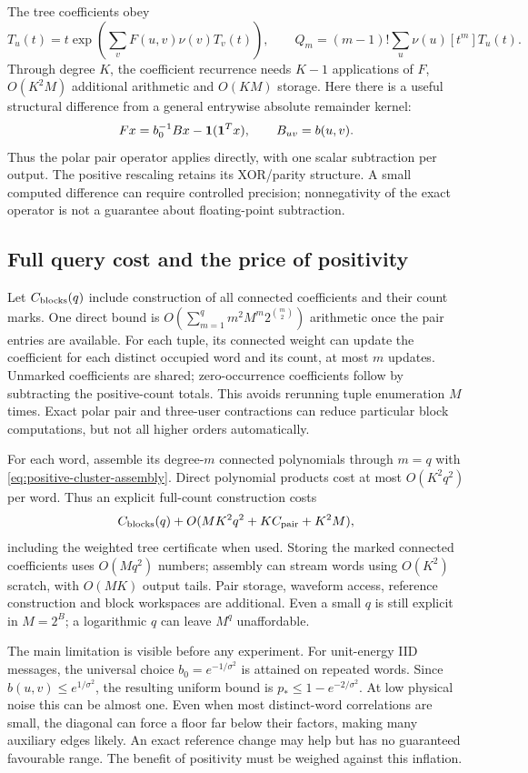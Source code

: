 \documentclass[10pt,a4paper]{article}
\begin{document}
The tree coefficients obey
\[
 T_u(t)=t\exp\!\left(\sum_v F(u,v)\nu(v)T_v(t)\right),\qquad
 Q_m=(m-1)!\sum_u\nu(u)[t^m]T_u(t).
\]
Through degree $K$, the coefficient recurrence needs $K-1$ applications of $F$, $O(K^2M)$ additional
arithmetic and $O(KM)$ storage. Here there is a useful structural difference from a general entrywise
absolute remainder kernel:
\begin{equation}
 F x=b_0^{-1}B x-\mathbf{1}(\mathbf{1}^Tx),\qquad B_{uv}=b(u,v).
 \label{eq:positive-cluster-operator}
\end{equation}
Thus the polar pair operator applies directly, with one scalar subtraction per output. The positive
rescaling retains its XOR/parity structure. A small computed difference can require controlled precision;
nonnegativity of the exact operator is not a guarantee about floating-point subtraction.

\subsection{Full query cost and the price of positivity}
Let $C_{\rm blocks}(q)$ include construction of all connected coefficients and their count marks.
One direct bound is
$O(\sum_{m=1}^q m^2 M^m2^{\binom m2})$ arithmetic once the pair entries are available.
For each tuple, its connected weight can update the coefficient for each distinct occupied word and its
count, at most $m$ updates. Unmarked coefficients are shared; zero-occurrence coefficients follow by
subtracting the positive-count totals. This avoids rerunning tuple enumeration $M$ times. Exact polar
pair and three-user contractions can reduce particular block computations, but not all higher orders
automatically.

For each word, assemble its degree-$m$ connected polynomials through $m=q$ with
\eqref{eq:positive-cluster-assembly}. Direct polynomial products cost at most $O(K^2q^2)$ per word.
Thus an explicit full-count construction costs
\[
 C_{\rm blocks}(q)+O(MK^2q^2+K C_{\rm pair}+K^2M),
\]
including the weighted tree certificate when used. Storing the marked connected coefficients uses
$O(Mq^2)$ numbers; assembly can stream words using $O(K^2)$ scratch, with $O(MK)$ output tails.
Pair storage, waveform access, reference construction and block workspaces are additional. Even a small
$q$ is still explicit in $M=2^B$; a logarithmic $q$ can leave $M^q$ unaffordable.

The main limitation is visible before any experiment. For unit-energy IID messages, the universal choice
$b_0=e^{-1/\sigma^2}$ is attained on repeated words. Since $b(u,v)\leq e^{1/\sigma^2}$, the resulting
uniform bound is $p_*\leq1-e^{-2/\sigma^2}$. At low physical noise this can be almost one. Even when most
distinct-word correlations are small, the diagonal can force a floor far below their factors, making many
auxiliary edges likely. An exact reference change may help but has no guaranteed favourable range.
The benefit of positivity must be weighed against this inflation.
\end{document}

